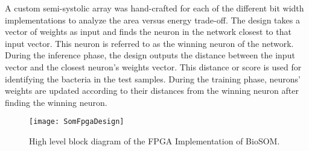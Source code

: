 A custom semi-systolic array was hand-crafted for each of the different bit width implementations to analyze the area versus energy trade-off. The design takes a vector of weights as input and finds the neuron in the network closest to that input vector. This neuron is referred to as the winning neuron of the network. During the inference phase, the design outputs the distance between the input vector and the closest neuron's weights vector. This distance or score is used for identifying the bacteria in the test samples. During the training phase, neurons' weights are updated according to their distances from the winning neuron after finding the winning neuron.
\begin{figure}[h]
	\centering
	\captionsetup{font=sf}
	\texttt{[image: SomFpgaDesign]}
	\caption{High level block diagram of the FPGA Implementation of BioSOM.}
	\label{fig:SOMFPGAImplementation}
\end{figure}
